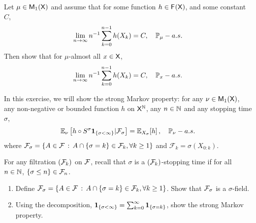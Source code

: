 \documentclass[english,graybox,envcountchap,envcountsame,sectrefs,shortlabels]{svmono}
\theoremstyle{style}
\begin{document}
\begin{exercise} \label{exo:solidarite}
Let $\mu\in\mathsf{M}_{1}(\mathsf{X})$ and assume that for some function $h\in\mathsf{F_{}}(\mathsf{X})$, and some constant $C$,
$$
\lim_{n\to \infty} n^{-1} \sum_{k=0}^{n-1} h(X_k)=C,\quad \mathbb{P}_\mu-a.s.
$$
Then show that for $\mu$-almost all $x\in\mathsf{X}$,
$$
\lim_{n\to \infty} n^{-1} \sum_{k=0}^{n-1} h(X_k)=C,\quad \mathbb{P}_x-a.s.
$$
\end{exercise}



\begin{exercise}\label{exo:strongMarkov}
In this exercise, we will show the strong Markov property: for any $\nu\in\mathsf{M}_{1}(\mathsf{X})$, any
non-negative or bounded function $h$ on $\mathsf{X}^{\mathbb{N}}$,  any
$n\in\mathbb{N}$ and any stopping time $\sigma$,
\begin{equation*}
\mathbb{E}_{\nu}\left[h\circ S^{\sigma} \mathbf{1}_{\left\{ \sigma <\infty\right\} }|\mathcal{F}_{\sigma}\right]=\mathbb{E}_{X_{\sigma}}[h]\,,\quad\mathbb{P}_{\nu}-a.s.
\end{equation*}
where $\mathcal{F}_\sigma=\left\{ A \in \mathcal{F}\,:\,A\cap \{\sigma =k\} \in \mathcal{F}_k,\forall k\geq 1\right\}$ and $\mathcal{F}_{k}=\sigma(X_{0:k})$.

For any filtration $(\mathcal{F}_k)$ on $\mathcal{F}$, recall that $\sigma$ is a $(\mathcal{F}_k)$-stopping time if for all $n\in\mathbb{N}$, $\{\sigma \leq n\}\in \mathcal{F}_n$.

\begin{enumerate}
\item Define $\mathcal{F}_\sigma=\left\{ A \in \mathcal{F}\,:\,A\cap \{\sigma =k\} \in \mathcal{F}_k,\forall k\geq 1\right\}$. Show that $\mathcal{F}_\sigma$ is a $\sigma$-field.
\item Using the decomposition, $ \mathbf{1}_{\left\{ \sigma <\infty\right\} }=\sum_{k=0}^\infty \mathbf{1}_{\left\{ \sigma=k\right\} }$, show the strong Markov property.
\end{enumerate}

\end{exercise}
\end{document}
